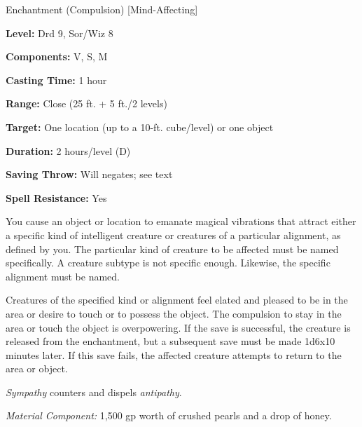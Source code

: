 \documentclass{article}
\begin{document}
Enchantment (Compulsion) [Mind-Affecting]

\textbf{Level:} Drd 9, Sor/Wiz 8

\textbf{Components:} V, S, M

\textbf{Casting Time:} 1 hour

\textbf{Range:} Close (25 ft. + 5 ft./2 levels)

\textbf{Target:} One location (up to a 10-ft. cube/level) or one object

\textbf{Duration:} 2 hours/level (D)

\textbf{Saving Throw: }Will negates; see text

\textbf{Spell Resistance:} Yes

You cause an object or location to emanate magical vibrations that attract either 
a specific kind of intelligent creature or creatures of a particular alignment, 
as defined by you. The particular kind of creature to be affected must be named 
specifically. A creature subtype is not specific enough. Likewise, the specific 
alignment must be named.

Creatures of the specified kind or alignment feel elated and pleased to be in the 
area or desire to touch or to possess the object. The compulsion to stay in the 
area or touch the object is overpowering. If the save is successful, the creature 
is released from the enchantment, but a subsequent save must be made 1d6x10 minutes 
later. If this save fails, the affected creature attempts to return to the area 
or object.

\textit{Sympathy }counters and dispels \textit{antipathy}.

\textit{Material Component: }1,500 gp worth of crushed pearls and a drop of honey.

\newpage
\end{document}
